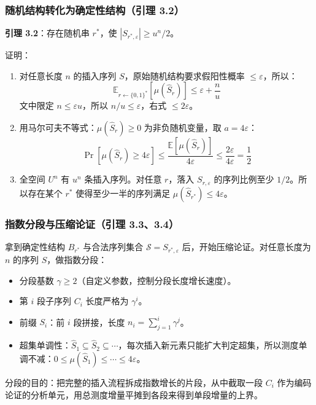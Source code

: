 \documentclass[UTF8,11pt,a4paper]{ctexart}
\newcommand{\E}{\mathbb{E}}
\begin{document}
\subsubsection{随机结构转化为确定性结构（引理 3.2）}

\textbf{引理 3.2}：存在随机串 $r^*$，使 $|S_{r^*,\varepsilon}| \ge u^n/2$。

证明：
\begin{enumerate}
    \item 对任意长度 $n$ 的插入序列 $S$，原始随机结构要求假阳性概率 $\le \varepsilon$，所以：
    \[
    \E_{r \leftarrow \{0,1\}^*}\left[\mu(\hat{S}_r)\right] \le \varepsilon + \frac{n}{u}
    \]
    文中限定 $n \le \varepsilon u$，所以 $n/u \le \varepsilon$，右式 $\le 2\varepsilon$。
    \item 用马尔可夫不等式：$\mu(\hat{S}_r) \ge 0$ 为非负随机变量，取 $a = 4\varepsilon$：
    \[
    \Pr\left[\mu(\hat{S}_r) \ge 4\varepsilon\right] \le \frac{\E[\mu(\hat{S}_r)]}{4\varepsilon} \le \frac{2\varepsilon}{4\varepsilon} = \frac{1}{2}
    \]
    \item 全空间 $U^n$ 有 $u^n$ 条插入序列。对任意 $r$，落入 $S_{r,\varepsilon}$ 的序列比例至少 $1/2$。所以存在某个 $r^*$ 使得至少一半的序列满足 $\mu(\hat{S}_{r^*}) \le 4\varepsilon$。
\end{enumerate}

\subsubsection{指数分段与压缩论证（引理 3.3、3.4）}

拿到确定性结构 $B_{r^*}$ 与合法序列集合 $\mathcal{S} = S_{r^*,\varepsilon}$ 后，开始压缩论证。对任意长度为 $n$ 的序列 $S$，做指数分段：
\begin{itemize}
    \item 分段基数 $\gamma \ge 2$（自定义参数，控制分段长度增长速度）。
    \item 第 $i$ 段子序列 $C_i$ 长度严格为 $\gamma^i$。
    \item 前缀 $S_i$：前 $i$ 段拼接，长度 $n_i = \sum_{j=1}^i \gamma^j$。
    \item 超集单调性：$\hat{S}_1 \subseteq \hat{S}_2 \subseteq \cdots$，每次插入新元素只能扩大判定超集，所以测度单调不减：$0 \le \mu(\hat{S}_1) \le \cdots \le 4\varepsilon$。
\end{itemize}

分段的目的：把完整的插入流程拆成指数增长的片段，从中截取一段 $C_i$ 作为编码论证的分析单元，用总测度增量平摊到各段来得到单段增量的上界。
\end{document}
